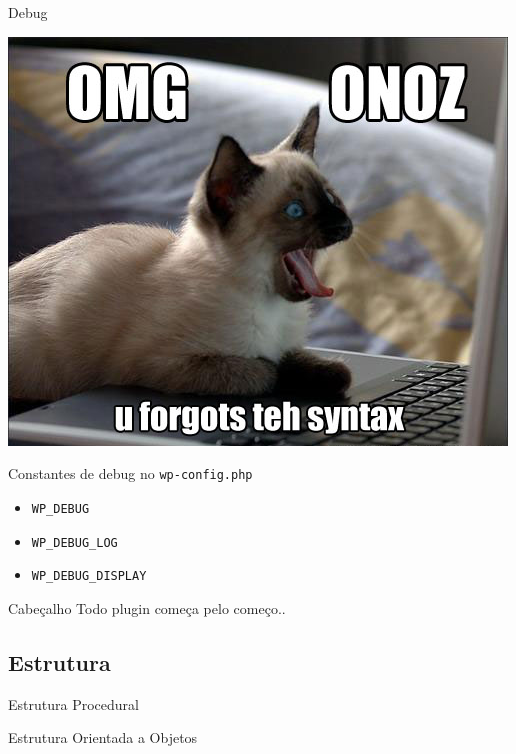 \documentclass{beamer}
\begin{document}
\begin{frame}{Debug}
\begin{center}
  \includegraphics[height=0.8\textheight]{./img/debug.jpg}
\end{center}
\end{frame}

\begin{frame}{Constantes de debug no \texttt{wp-config.php}}
\begin{itemize}
  \item \pause \texttt{WP\_DEBUG}
  \item \pause \texttt{WP\_DEBUG\_LOG}
  \item \pause \texttt{WP\_DEBUG\_DISPLAY}
\end{itemize}
\end{frame}

\begin{frame}{Cabeçalho}
  \pause Todo plugin começa pelo começo..
  \pause 
\end{frame}

\subsection{Estrutura}

\begin{frame}{Estrutura Procedural}
  \pause 
\end{frame}

\begin{frame}{Estrutura Orientada a Objetos}
  \pause 
\end{frame}
\end{document}
